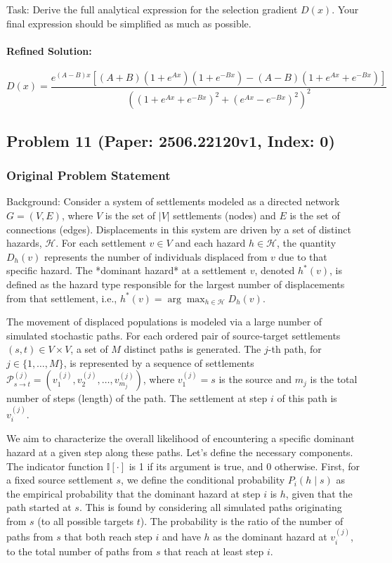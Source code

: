 \documentclass[10pt]{article}
\begin{document}
Task:
Derive the full analytical expression for the selection gradient $D(x)$. Your final expression should be simplified as much as possible.


\paragraph*{Refined Solution:}
\[ D(x) = \frac{e^{(A-B)x} \left[ (A+B)(1+e^{Ax})(1+e^{-Bx}) - (A-B)(1+e^{Ax}+e^{-Bx}) \right]}{\left( (1+e^{Ax}+e^{-Bx})^2 + (e^{Ax}-e^{-Bx})^2 \right)^2} \]

\newpage
\subsection*{Problem 11 (Paper: 2506.22120v1, Index: 0)}

\subsubsection*{Original Problem Statement}
Background:  
Consider a system of settlements modeled as a directed network $G=(V,E)$, where $V$ is the set of $|V|$ settlements (nodes) and $E$ is the set of connections (edges). Displacements in this system are driven by a set of distinct hazards, $\mathcal{H}$. For each settlement $v \in V$ and each hazard $h \in \mathcal{H}$, the quantity $D_h(v)$ represents the number of individuals displaced from $v$ due to that specific hazard. The *dominant hazard* at a settlement $v$, denoted $h^*(v)$, is defined as the hazard type responsible for the largest number of displacements from that settlement, i.e., $h^*(v) = \arg\max_{h \in \mathcal{H}} D_h(v)$.

The movement of displaced populations is modeled via a large number of simulated stochastic paths. For each ordered pair of source-target settlements $(s, t) \in V \times V$, a set of $M$ distinct paths is generated. The $j$-th path, for $j \in \{1, \dots, M\}$, is represented by a sequence of settlements $\mathcal{P}^{(j)}_{s \to t} = (v^{(j)}_1, v^{(j)}_2, \dots, v^{(j)}_{m_j})$, where $v^{(j)}_1 = s$ is the source and $m_j$ is the total number of steps (length) of the path. The settlement at step $i$ of this path is $v^{(j)}_i$.

We aim to characterize the overall likelihood of encountering a specific dominant hazard at a given step along these paths. Let's define the necessary components. The indicator function $\mathbb{I}[\cdot]$ is 1 if its argument is true, and 0 otherwise. First, for a fixed source settlement $s$, we define the conditional probability $P_i(h \mid s)$ as the empirical probability that the dominant hazard at step $i$ is $h$, given that the path started at $s$. This is found by considering all simulated paths originating from $s$ (to all possible targets $t$). The probability is the ratio of the number of paths from $s$ that both reach step $i$ and have $h$ as the dominant hazard at $v^{(j)}_i$, to the total number of paths from $s$ that reach at least step $i$.
\end{document}
